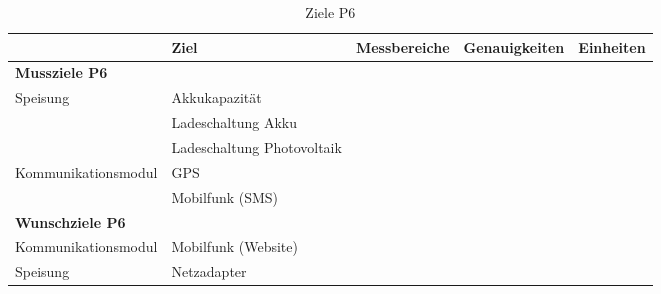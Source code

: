 \begin{landscape}
\begin{table}[htbp]
  \centering
  \caption{Ziele P6}
    \begin{tabular}{l|l|r|r|r}
          & \textbf{Ziel} & \multicolumn{1}{l|}{\textbf{Messbereiche}} & \multicolumn{1}{l|}{\textbf{Genauigkeiten}} & \multicolumn{1}{l}{\textbf{Einheiten}} \\
    \toprule
    \multicolumn{1}{l}{\textbf{Mussziele P6}} & \multicolumn{1}{r}{} & \multicolumn{1}{r}{} & \multicolumn{1}{r}{} &  \\
    \toprule
    Speisung & Akkukapazität &       &       &  \\
\cline{2-5}          & Ladeschaltung Akku &       &       &  \\
\cline{2-5}           & Ladeschaltung Photovoltaik &       &       &  \\
    \hline
    Kommunikationsmodul & GPS   &       &       &  \\
\cline{2-5}          & Mobilfunk (SMS) &       &       &  \\
    \bottomrule
    \multicolumn{1}{l}{\textbf{Wunschziele P6}} & \multicolumn{1}{r}{} & \multicolumn{1}{r}{} & \multicolumn{1}{r}{} &  \\
    \toprule
    Kommunikationsmodul & Mobilfunk (Website) &       &       &  \\
    \hline
    Speisung & Netzadapter &       &       &  \\
    \bottomrule
    \end{tabular}%
  \label{tab:ZieleP6}%
\end{table}%
\end{landscape}

